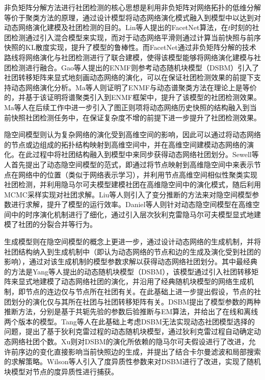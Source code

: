 非负矩阵分解方法进行社团检测的核心思想是利用非负矩阵对网络拓扑的低维分解等价于聚类方法的原理，通过设计模型将动态网络演化模式融入到模型中以达到对动态网络演化建模及社团检测的目的\cite{KXTS202104002}。Lin等人\cite{lin2009analyzing}提出的FacetNet算法，在$t$时刻的社团检测通过引入混合模型来实现，而对于动态网络平滑则通过计算当前快照与前序快照的KL散度实现，提升了模型的鲁棒性。而FacetNet通过非负矩阵分解的技术路线将网络演化与社团检测进行了联合建模，使得该模型能够将网络演化建模与社团检测进行融合。Gao等人\cite{gao2017dynamic}提出的ENMF则参考动态随机块模型（DSBM）\cite{yang2011detecting}引入了社团转移矩阵来显式地刻画动态网络的演化，可以在保证社团检测效果的前提下支持动态网络演化分析。Ma等人\cite{ma2017evolutionary}则证明了ENMF与动态谱聚类方法在理论上是等价的，并基于该证明将谱聚类引入到ENMF框架中，提升了该模型的社团检测效果。Ma等人\cite{ma2019detecting}在后续工作中进一步引入了图正则项将动态网络历史快照的结构融入到当前快照社团检测任务中，在保证复杂度不增的前提下进一步提升了社团检测效果。

隐空间模型则认为复杂网络的演化受到高维空间的影响，因此可以通过将动态网络的节点或边组成的拓扑结构映射到高维空间中，并在高维空间建模动态网络的演化。在此过程中将社团结构融入到模型中来同步获得动态网络社团划分。Sewell等人\cite{sewell2015latent}首先提出了动态隐空间模型的范式，即通过将节点映射到高维隐空间中来表示节点在网络中的位置（类似于网络表示学习），并利用节点高维空间相似性聚类实现社团检测，并利用隐马尔可夫模型建模社团在高维隐空间中的演化模式，随后利用MCMC采样实现对社团求解。Liu等人\cite{liu2022variational}则引入了变分推断的方法来对隐空间模型参数进行求解，提升了模型的运行效率。Daniel等人\cite{daniel2023bayesian}则针对动态隐空间模型在高维空间中的时序演化机制进行了细化，通过引入层次狄利克雷隐马尔可夫模型显式地建模了社团的分裂合并等行为。

生成模型则在隐空间模型的概念上更进一步，通过设计动态网络的生成机制，并将社团结构纳入到生成机制中（即认为动态网络的节点和边的生成及演化受到社团的影响），通过对该生成机制的模型参数求解以获得动态网络社团划分。其中最经典的方法是Yang等人\cite{yang2011detecting}提出的动态随机块模型（DSBM），该模型通过引入社团转移矩阵来显式地建模了动态网络社团的演化，并沿用了经典随机块模型的网络生成机制，即节点的连边仅与节点所在社团有关。在此基础上进一步提出假设，节点的社团划分的演化仅与其所在社团与社团转移矩阵有关。DSBM提出了模型参数的两种推断方法，分别是基于共轭先验的参数后验推断与EM算法，并给出了在线和离线两个版本的模型。Tang等人\cite{tang2014detecting}在此基础上考虑DSBM无法实现动态社团模型选择的问题，提出了基于狄利克雷过程的动态随机块模型，通过狄利克雷过程自动确定动态网络社团个数。Xu\cite{xu2015stochastic}则对DSBM的演化所依赖的隐马尔可夫假设进行了改进，允许前序边的变化直接影响当前快照边的生成，并提出了结合卡尔曼滤波和局部搜索的求解策略。Wilson等人\cite{wilson2019modeling}引入了度异质性参数来对DSBM进行了改进，实现了随机块模型对节点的度异质性进行捕获。

